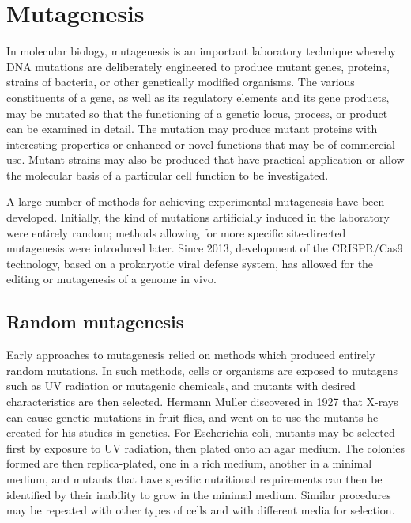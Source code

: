 \hypertarget{mutagenesis-1}{%
\section{Mutagenesis}\label{mutagenesis-1}}

In molecular biology, mutagenesis is an important laboratory technique whereby DNA mutations are deliberately engineered to produce mutant genes, proteins, strains of bacteria, or other genetically modified organisms. The various constituents of a gene, as well as its regulatory elements and its gene products, may be mutated so that the functioning of a genetic locus, process, or product can be examined in detail. The mutation may produce mutant proteins with interesting properties or enhanced or novel functions that may be of commercial use. Mutant strains may also be produced that have practical application or allow the molecular basis of a particular cell function to be investigated.

A large number of methods for achieving experimental mutagenesis have been developed. Initially, the kind of mutations artificially induced in the laboratory were entirely random; methods allowing for more specific site-directed mutagenesis were introduced later. Since 2013, development of the CRISPR/Cas9 technology, based on a prokaryotic viral defense system, has allowed for the editing or mutagenesis of a genome in vivo.

\hypertarget{random-mutagenesis}{%
\subsection{Random mutagenesis}\label{random-mutagenesis}}

Early approaches to mutagenesis relied on methods which produced entirely random mutations. In such methods, cells or organisms are exposed to mutagens such as UV radiation or mutagenic chemicals, and mutants with desired characteristics are then selected. Hermann Muller discovered in 1927 that X-rays can cause genetic mutations in fruit flies, and went on to use the mutants he created for his studies in genetics. For Escherichia coli, mutants may be selected first by exposure to UV radiation, then plated onto an agar medium. The colonies formed are then replica-plated, one in a rich medium, another in a minimal medium, and mutants that have specific nutritional requirements can then be identified by their inability to grow in the minimal medium. Similar procedures may be repeated with other types of cells and with different media for selection.

